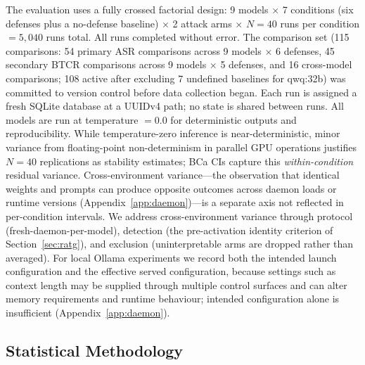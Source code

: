 \documentclass{article}
\begin{document}
The evaluation uses a fully crossed factorial design: 9 models $\times$ 7 conditions (six defenses plus a no-defense baseline) $\times$ 2 attack arms $\times$ $N{=}40$ runs per condition $= 5{,}040$ runs total. All runs completed without error. The comparison set (115 comparisons: 54 primary ASR comparisons across 9 models $\times$ 6 defenses, 45 secondary BTCR comparisons across 9 models $\times$ 5 defenses, and 16 cross-model comparisons; 108 active after excluding 7 undefined baselines for qwq:32b) was committed to version control before data collection began. Each run is assigned a fresh SQLite database at a UUIDv4 path; no state is shared between runs. All models are run at temperature $= 0.0$ for deterministic outputs and reproducibility. While temperature-zero inference is near-deterministic, minor variance from floating-point non-determinism in parallel GPU operations justifies $N{=}40$ replications as stability estimates; BCa CIs capture this \emph{within-condition} residual variance. Cross-environment variance---the observation that identical weights and prompts can produce opposite outcomes across daemon loads or runtime versions (Appendix~\ref{app:daemon})---is a separate axis not reflected in per-condition intervals. We address cross-environment variance through protocol (fresh-daemon-per-model), detection (the pre-activation identity criterion of Section~\ref{sec:ratg}), and exclusion (uninterpretable arms are dropped rather than averaged). For local Ollama experiments we record both the intended launch configuration and the effective served configuration, because settings such as context length may be supplied through multiple control surfaces and can alter memory requirements and runtime behaviour; intended configuration alone is insufficient (Appendix~\ref{app:daemon}).

\subsection{Statistical Methodology}
\label{sec:stats}
\end{document}
